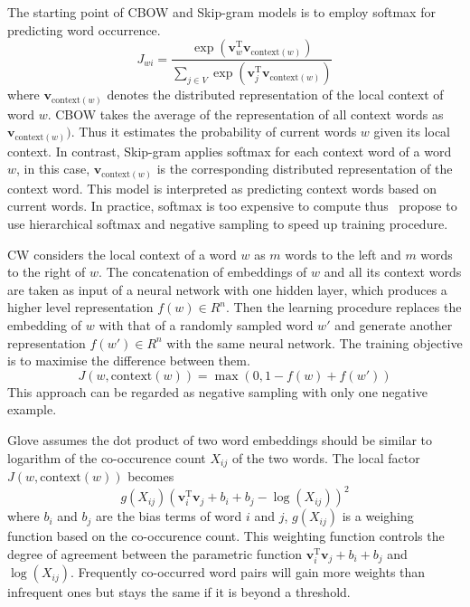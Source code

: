 The starting point of CBOW and Skip-gram models is to employ softmax for predicting word occurrence.
\begin{equation}
J_{wi} = \frac{\exp(\mathbf{v}_w^{\text{T}} \mathbf{v}_{\text{context}(w)})}{\sum_{j \in V} \exp(\mathbf{v}_j^{\text{T}} \mathbf{v}_{\text{context}(w)})}
\end{equation}
where $\mathbf{v}_{\text{context}(w)}$ denotes the distributed representation of the local context of word $w$. CBOW takes the average of the representation of all context words as $\mathbf{v}_{\text{context}(w)})$. Thus it estimates the probability of current words $w$ given its local context. In contrast, Skip-gram applies softmax for each context word of a word $w$, in this case, $\mathbf{v}_{\text{context}(w)}$ is the corresponding distributed representation of the context word. This model is interpreted as predicting context words based on current words. In practice, softmax is too expensive to compute thus~\newcite{} propose to use hierarchical softmax and negative sampling to speed up training procedure.

CW considers the local context of a word $w$ as $m$ words to the left and $m$ words to the right of $w$. The concatenation of embeddings of $w$ and all its context words are taken as input of a neural network with one hidden layer, which produces a higher level representation $f(w) \in R^n$. Then the learning procedure replaces the embedding of $w$ with that of a randomly sampled word $w'$ and generate another representation $f(w') \in R^n$ with the same neural network. The training objective is to maximise the difference between them.
\begin{equation}
J(w, \text{context}(w)) = \max (0, 1 - f(w) + f(w'))
\end{equation}
This approach can be regarded as negative sampling with only one negative example.

Glove assumes the dot product of two word embeddings should be similar to logarithm of the co-occurence count $X_{ij}$ of the two words. The local factor $J(w, \text{context}(w))$ becomes
\begin{equation}
g(X_{ij}) (\mathbf{v}_i^{\text{T}} \mathbf{v}_j + b_i + b_j - \log(X_{ij}))^2
\end{equation}
where $b_i$ and $b_j$ are the bias terms of word $i$ and $j$, $g(X_{ij})$ is a weighing function based on the co-occurence count. This weighting function controls the degree of agreement between the parametric function $\mathbf{v}_i^{\text{T}} \mathbf{v}_j + b_i + b_j $ and $\log(X_{ij})$. Frequently co-occurred word pairs will gain more weights than infrequent ones but stays the same if it is beyond a threshold.

